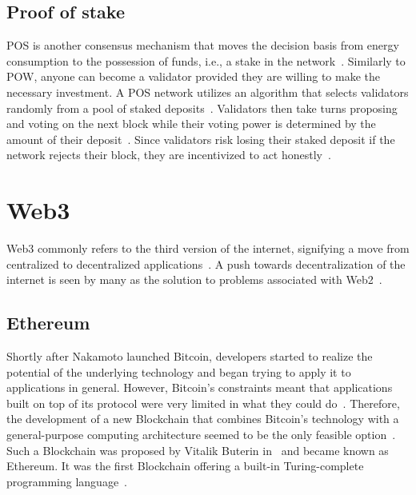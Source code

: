 \subsection{Proof of stake}\label{subsec:pos}

\Gls{POS} is another consensus mechanism that moves the decision basis from energy consumption to the possession of funds, i.e., a stake in the network~\autocites[321]{antonopoulos_mastering_2019}[chapter 1]{udokwu_state_2018}[3]{udokwu_evaluation_2020}.
Similarly to \gls{POW}, anyone can become a validator provided they are willing to make the necessary investment.
A \gls{POS} network utilizes an algorithm that selects validators randomly from a pool of staked deposits~\autocite[3]{udokwu_evaluation_2020}.
Validators then take turns proposing and voting on the next block while their voting power is determined by the amount of their deposit~\autocite[321]{antonopoulos_mastering_2019}.
Since validators risk losing their staked deposit if the network rejects their block, they are incentivized to act honestly~\autocite[321]{antonopoulos_mastering_2019}.

\section{Web3}\label{sec:web3}

\Gls{Web3} commonly refers to the third version of the internet, signifying a move from centralized to decentralized applications~\autocite[xxxv]{antonopoulos_mastering_2019}.
A push towards decentralization of the internet is seen by many as the solution to problems associated with \gls{Web2}~\autocite{feiner_prominent_nodate}.

\subsection{Ethereum}\label{subsec:ethereum}

Shortly after Nakamoto launched Bitcoin, developers started to realize the potential of the underlying technology and began trying to apply it to applications in general.
However, Bitcoin's constraints meant that applications built on top of its protocol were very limited in what they could do~\autocite[3]{antonopoulos_mastering_2019}.
Therefore, the development of a new \gls{Blockchain} that combines Bitcoin's technology with a general-purpose computing architecture seemed to be the only feasible option~\autocite[3]{antonopoulos_mastering_2019}.
Such a \gls{Blockchain} was proposed by Vitalik Buterin in~\citeyear{buterin_ethereum_2014} and became known as Ethereum.
It was the first \gls{Blockchain} offering a built-in Turing-complete programming language~\autocite[13]{buterin_ethereum_2014}.

